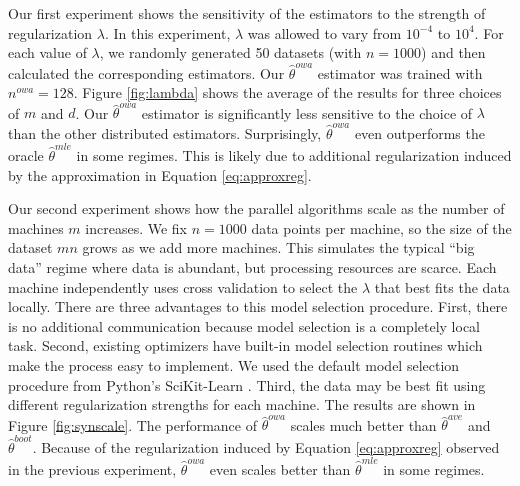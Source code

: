 \documentclass[twoside]{article}
\newcommand{\nowa}{n^{\textit{owa}}}
\newcommand{\w}{\theta}
\newcommand{\wowa}{\hat\w^{owa}}
\newcommand{\wave}{\hat\w^{ave}}
\newcommand{\wboot}{\hat\w^{boot}}
\newcommand{\wmle}{\hat\w^{mle}}
\begin{document}
Our first experiment shows the sensitivity of the estimators to the strength of regularization $\lambda$.
In this experiment, $\lambda$ was allowed to vary from $10^{-4}$ to $10^4$.
For each value of $\lambda$, we randomly generated 50 datasets (with $n=1000$) and then calculated the corresponding estimators.
Our $\wowa$ estimator was trained with $\nowa=128$.
Figure \ref{fig:lambda} shows the average of the results for three choices of $m$ and $d$.
Our $\wowa$ estimator is significantly less sensitive to the choice of $\lambda$ than the other distributed estimators.
Surprisingly, $\wowa$ even outperforms the oracle $\wmle$ in some regimes.
This is likely due to additional regularization induced by the approximation in Equation \ref{eq:approxreg}.

Our second experiment shows how the parallel algorithms scale as the number of machines $m$ increases.
We fix $n=1000$ data points per machine,
so the size of the dataset $mn$ grows as we add more machines.
This simulates the typical ``big data'' regime where data is abundant,
but processing resources are scarce.
Each machine independently uses cross validation to select the $\lambda$ that best fits the data locally.
There are three advantages to this model selection procedure.
First, there is no additional communication because model selection is a completely local task.
Second, existing optimizers have built-in model selection routines which make the process easy to implement.
We used the default model selection procedure from Python's SciKit-Learn \citep{scikit-learn}.
Third, the data may be best fit using different regularization strengths for each machine.
The results are shown in Figure \ref{fig:synscale}.
The performance of $\wowa$ scales much better than $\wave$ and $\wboot$.
Because of the regularization induced by Equation \ref{eq:approxreg} observed in the previous experiment,
$\wowa$ even scales better than $\wmle$ in some regimes.
\end{document}
